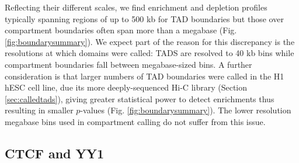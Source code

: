 \documentclass[a4paper,11pt,oneside]{book}
\begin{document}
Reflecting their different scales, we find enrichment and depletion profiles typically
spanning regions of up to 500 kb for TAD boundaries but those over compartment boundaries often span more than a megabase (Fig. \ref{fig:boundarysummary}). We expect part of the reason for this discrepancy is the resolutions at which domains were called: TADS are resolved to 40 kb bins while compartment boundaries fall between megabase-sized bins. A further consideration is that larger numbers of TAD boundaries were called in the H1 hESC cell line, due its more deeply-sequenced Hi-C library (Section \ref{sec:calledtads}), giving greater statistical power to detect enrichments thus resulting in smaller $p$-values (Fig. \ref{fig:boundarysummary}). The lower resolution megabase bins used in compartment calling do not suffer from this issue.



\subsection{CTCF and YY1}\label{sec:ctcfyy1}
\end{document}
